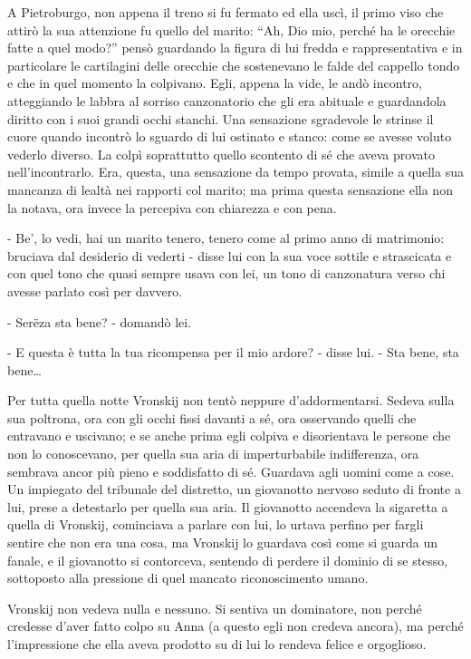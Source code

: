 A Pietroburgo, non appena il treno si fu fermato ed ella uscì, il primo viso che attirò la sua attenzione fu quello del marito: ``Ah, Dio mio, perché ha le orecchie fatte a quel modo?'' pensò guardando la figura di lui fredda e rappresentativa e in particolare le cartilagini delle orecchie che sostenevano le falde del cappello tondo e che in quel momento la colpivano. Egli, appena la vide, le andò incontro, atteggiando le labbra al sorriso canzonatorio che gli era abituale e guardandola diritto con i suoi grandi occhi stanchi. Una sensazione sgradevole le strinse il cuore quando incontrò lo sguardo di lui ostinato e stanco: come se avesse voluto vederlo diverso. La colpì soprattutto quello scontento di sé che aveva provato nell'incontrarlo. Era, questa, una sensazione da tempo provata, simile a quella sua mancanza di lealtà nei rapporti col marito; ma prima questa sensazione ella non la notava, ora invece la percepiva con chiarezza e con pena. 

- Be', lo vedi, hai un marito tenero, tenero come al primo anno di matrimonio: bruciava dal desiderio di vederti - disse lui con la sua voce sottile e strascicata e con quel tono che quasi sempre usava con lei, un tono di canzonatura verso chi avesse parlato così per davvero. 

- Serëza sta bene? - domandò lei. 

- E questa è tutta la tua ricompensa per il mio ardore? - disse lui. - Sta bene, sta bene\ldots{} 

Per tutta quella notte Vronskij non tentò neppure d'addormentarsi. Sedeva sulla sua poltrona, ora con gli occhi fissi davanti a sé, ora osservando quelli che entravano e uscivano; e se anche prima egli colpiva e disorientava le persone che non lo conoscevano, per quella sua aria di imperturbabile indifferenza, ora sembrava ancor più pieno e soddisfatto di sé. Guardava agli uomini come a cose. Un impiegato del tribunale del distretto, un giovanotto nervoso seduto di fronte a lui, prese a detestarlo per quella sua aria. Il giovanotto accendeva la sigaretta a quella di Vronskij, cominciava a parlare con lui, lo urtava perfino per fargli sentire che non era una cosa, ma Vronskij lo guardava così come si guarda un fanale, e il giovanotto si contorceva, sentendo di perdere il dominio di se stesso, sottoposto alla pressione di quel mancato riconoscimento umano. 

Vronskij non vedeva nulla e nessuno. Si sentiva un dominatore, non perché credesse d'aver fatto colpo su Anna (a questo egli non credeva ancora), ma perché l'impressione che ella aveva prodotto su di lui lo rendeva felice e orgoglioso. 

